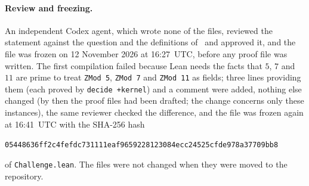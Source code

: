 \documentclass[11pt]{article}
\theoremstyle{remark}
\begin{document}
\paragraph{Review and freezing.}
An independent Codex agent, which wrote none of the files, reviewed the
statement against the question and the definitions of~\cite{gs} and approved
it, and the file was frozen on 12 November 2026 at 16:27~UTC, before any proof
file was written. The first compilation failed because Lean needs the facts that
$5$, $7$ and $11$ are prime to treat \texttt{ZMod 5}, \texttt{ZMod 7} and
\texttt{ZMod 11} as fields; three lines providing them (each proved by
\texttt{decide +kernel}) and a comment were added, nothing else changed (by
then the proof files had been drafted; the change concerns only these
instances), the same reviewer
checked the difference, and the file was frozen again at 16:41~UTC with the
SHA-256 hash
\begin{center}\small
\texttt{05448636ff2c4fefdc731111eaf9659228123084ecc24525cfde978a37709bb8}
\end{center}
of \texttt{Challenge.lean}. The files were not changed when they were moved to
the repository.
\end{document}

